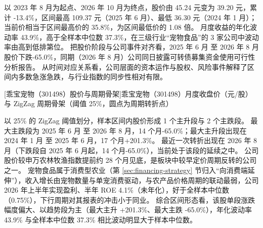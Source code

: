  以 2023 年 8 月为起点、2026 年 10 月为终点，股价由 45.24 元变为 39.20 元，累计 -13.4\%，区间最高 109.37 元（2025 年 6 月）、最低 36.30 元（2024 年 1 月）；当前价相当于区间最高价的 35.8\%，为区间最低价的 1.08 倍。 月度收益的年化波动率 43.9\%，高于全样本中位数 37.3\%，在三级行业“宠物食品”的 3 家公司中波动率由高到低排第位。 把股价阶段与公司事件对齐看，2025 年 6 月 至 2026 年 8 月股价下跌-65.0\%，同期（2026 年 8 月）公司同日披露可转债募集资金使用可行性分析报告。 从时间对应关系看，公司层面的资本运作与股权、风险事件解释了区间内多数急涨急跌，与行业指数的同步性相对有限。

\begin{center}
\begin{minipage}{\textwidth}\centering
{}

[乖宝宠物（301498）股价与周期骨架]{乖宝宠物（301498）月度收盘价（元/股）与 ZigZag 周期骨架（阈值 25\%，圆点为周期转折点）}
\end{minipage}
\end{center}

 以 25\% 的 ZigZag 阈值划分，样本区间内股价形成 1 个主升段与 2 个主跌段。 最大主跌段为 2025 年 6 月 至 2026 年 8 月，14 个月-65.0\%；最大主升段出现在 2024 年 1 月 至 2025 年 6 月，17 个月+201.3\%。 最近一次转折出现在 2026 年 8 月（下跌段自 2025 年 6 月起，14 个月-65.0\%），当前处于该段的延续之中。 公司股价较申万农林牧渔指数提前约 28 个月见底，是板块中较早定价周期反转的公司之一。 宠物食品属于消费型农业（第 \ref{sec:financing-strategy} 节归入“向消费端延伸”），收入增长由宠物数量与单宠消费驱动，与农产品价格周期的联动最弱，公司 2026 年上半年实现盈利、半年 ROE 4.1\%（未年化），好于全样本中位数（0.75\%），下行周期对其报表的冲击小于同业。 综合区间形态看，该股单段涨跌幅度偏大、以趋势段为主（最大主升 +201.3\%、最大主跌 -65.0\%），年化波动率 43.9\% 与全样本中位数 37.3\% 相比波动明显大于样本中位数。

